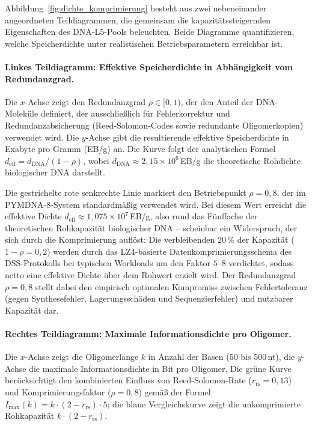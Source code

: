 ﻿\documentclass[a4paper,12pt]{article}
\theoremstyle{definition}
\begin{document}
Abbildung~\ref{fig:dichte_komprimierung} besteht aus zwei nebeneinander angeordneten Teildiagrammen, die gemeinsam die kapazitätssteigernden Eigenschaften des DNA-L5-Pools beleuchten. Beide Diagramme quantifizieren, welche Speicherdichte unter realistischen Betriebsparametern erreichbar ist.

\paragraph{Linkes Teildiagramm: Effektive Speicherdichte in Abhängigkeit vom Redundanzgrad.}
Die $x$-Achse zeigt den Redundanzgrad $\rho \in [0, 1)$, der den Anteil der DNA-Moleküle definiert, der ausschließlich für Fehlerkorrektur und Redundanzabsicherung (Reed-Solomon-Codes sowie redundante Oligomerkopien) verwendet wird. Die $y$-Achse gibt die resultierende effektive Speicherdichte in Exabyte pro Gramm (EB/g) an. Die Kurve folgt der analytischen Formel $d_{\mathrm{eff}} = d_{\mathrm{DNA}} / (1 - \rho)$, wobei $d_{\mathrm{DNA}} \approx 2{,}15 \times 10^{6}$\,EB/g die theoretische Rohdichte biologischer DNA darstellt.

Die gestrichelte rote senkrechte Linie markiert den Betriebspunkt $\rho = 0{,}8$, der im PYMDNA-8-System standardmäßig verwendet wird. Bei diesem Wert erreicht die effektive Dichte $d_{\mathrm{eff}} \approx 1{,}075 \times 10^{7}$\,EB/g, also rund das Fünffache der theoretischen Rohkapazität biologischer DNA -- scheinbar ein Widerspruch, der sich durch die Komprimierung auflöst: Die verbleibenden $20$\,\% der Kapazität ($1 - \rho = 0{,}2$) werden durch das LZ4-basierte Datenkomprimierungsschema des DSS-Protokolls bei typischen Workloads um den Faktor $5$--$8$ verdichtet, sodass netto eine effektive Dichte über dem Rohwert erzielt wird. Der Redundanzgrad $\rho = 0{,}8$ stellt dabei den empirisch optimalen Kompromiss zwischen Fehlertoleranz (gegen Synthesefehler, Lagerungsschäden und Sequenzierfehler) und nutzbarer Kapazität dar.

\paragraph{Rechtes Teildiagramm: Maximale Informationsdichte pro Oligomer.}
Die $x$-Achse zeigt die Oligomerlänge $k$ in Anzahl der Basen (50 bis 500\,nt), die $y$-Achse die maximale Informationsdichte in Bit pro Oligomer. Die grüne Kurve berücksichtigt den kombinierten Einfluss von Reed-Solomon-Rate ($r_{\mathrm{rs}} = 0{,}13$) und Komprimierungsfaktor ($\rho = 0{,}8$) gemäß der Formel $I_{\max}(k) = k \cdot (2 - r_{\mathrm{rs}}) \cdot 5$; die blaue Vergleichskurve zeigt die unkomprimierte Rohkapazität $k \cdot (2 - r_{\mathrm{rs}})$.
\end{document}
